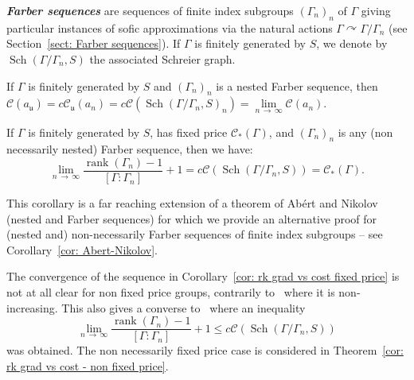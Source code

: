 \documentclass[AHL,Unicode,longabstracts,published]{cedram}
\newcommand{\defin}[1]{\textbf{\emph{#1}}}
\newcommand{\acting}{\curvearrowright}
\newcommand{\cost}{\mathcal{C}}
\newcommand{\ccost}{c\mathcal{C}}
\newcommand{\vraicost}{\mathscr{C}}
\DeclareMathOperator{\rank}{rank}
\DeclareMathOperator{\Sch}{Sch}
\newcommand{\ul}{\mathfrak{u}}
\begin{document}
\defin{Farber sequences} are sequences of finite index subgroups $(\Gamma_n)_n$ of $\Gamma$ giving particular instances of sofic approximations via the natural actions $\Gamma\acting \Gamma/\Gamma_n$ (see Section~\ref{sect: Farber sequences}). If $\Gamma$ is finitely generated by $S$, we denote by $\Sch(\Gamma/\Gamma_n, S)$ the associated Schreier graph.


\begin{coro}\label{cor-intro nested Farber sequences}
If $\Gamma$ is finitely generated by $S$ and $(\Gamma_n)_n$ is a nested Farber sequence, then $\cost(a_{\ul})=\ccost_{\ul}(a_n)=\ccost(\Sch(\Gamma/\Gamma_n, S)_n)=\lim\limits_{n\,\to\,\infty} \cost(a_n)$.
\end{coro}


\begin{coro}\label{cor-intro:cor: rk grad vs cost fixed price}
If $\Gamma$ is finitely generated by $S$, has fixed price $\vraicost_*(\Gamma)$, and $(\Gamma_n)_n$ is any (non necessarily nested) Farber sequence, then we have:
\[
\lim\limits_{n\,\to\,\infty} \frac{\rank(\Gamma_n)-1}{\left[\Gamma:\Gamma_n\right]}+1=\ccost\left(\Sch\left(\Gamma/\Gamma_n, S\right)\right)=\vraicost_*(\Gamma).
\]
\end{coro}


This corollary is a far reaching extension of a theorem of Abért and Nikolov~\cite[Theorem~1]{Abert-Nikolov-12} (nested and Farber sequences) for which we provide an alternative proof for (nested and) non-necessarily Farber sequences of finite index subgroups -- see Corollary~\ref{cor: Abert-Nikolov}.


The convergence of the sequence in Corollary~\ref{cor: rk grad vs cost fixed price} is not at all clear for non fixed price groups, contrarily to~\cite[Theorem~1]{Abert-Nikolov-12} where it is non-increasing. This also gives a converse to~\cite[Theorem~8]{Abert-Nikolov-Gelander} where an inequality
\[
\lim\limits_{n\,\to\,\infty} \frac{\rank(\Gamma_n)-1}{\left[\Gamma:\Gamma_n\right]}+1\leq \ccost\left(\Sch\left(\Gamma/\Gamma_n, S\right)\right)
\]
was obtained. The non necessarily fixed price case is considered in Theorem~\ref{cor: rk grad vs cost - non fixed price}.
\end{document}
